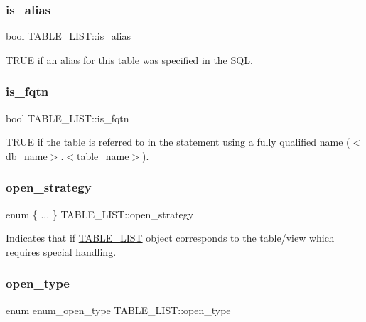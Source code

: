 \subsubsection{\texorpdfstring{is\+\_\+alias}{is\_alias}}
{\footnotesize\ttfamily bool T\+A\+B\+L\+E\+\_\+\+L\+I\+S\+T\+::is\+\_\+alias}

T\+R\+UE if an alias for this table was specified in the S\+QL. \mbox{\label{structTABLE__LIST_a497fa25f3f142c883057ad2f37eae87c}} 
\subsubsection{\texorpdfstring{is\+\_\+fqtn}{is\_fqtn}}
{\footnotesize\ttfamily bool T\+A\+B\+L\+E\+\_\+\+L\+I\+S\+T\+::is\+\_\+fqtn}

T\+R\+UE if the table is referred to in the statement using a fully qualified name ($<$db\+\_\+name$>$.$<$table\+\_\+name$>$). \mbox{\label{structTABLE__LIST_aa5584240bf59a147fff802fb18e1704e}} 
\subsubsection{\texorpdfstring{open\+\_\+strategy}{open\_strategy}}
{\footnotesize\ttfamily enum \{ ... \}   T\+A\+B\+L\+E\+\_\+\+L\+I\+S\+T\+::open\+\_\+strategy}

Indicates that if \mbox{\hyperlink{structTABLE__LIST}{T\+A\+B\+L\+E\+\_\+\+L\+I\+ST}} object corresponds to the table/view which requires special handling. \mbox{\label{structTABLE__LIST_a258a1d3e3c052cd563fb5690b70e86e8}} 
\subsubsection{\texorpdfstring{open\+\_\+type}{open\_type}}
{\footnotesize\ttfamily enum enum\+\_\+open\+\_\+type T\+A\+B\+L\+E\+\_\+\+L\+I\+S\+T\+::open\+\_\+type}

